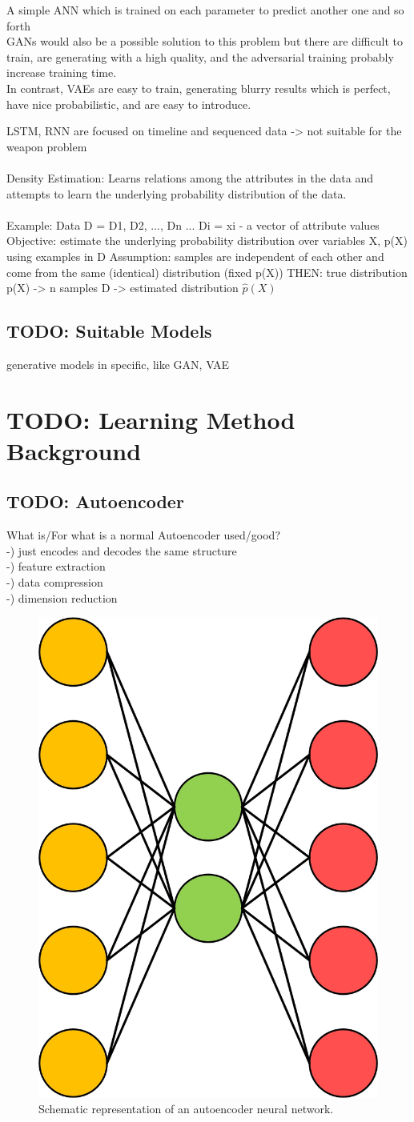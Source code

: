 \documentclass[MGS,Master,english]{twbook}%
\begin{document}
{A simple ANN which is trained on each parameter to predict another one and so forth\\
GANs would also be a possible solution to this problem but there are difficult to train, are generating with a high quality, and the adversarial training probably increase training time.\\
In contrast, VAEs are easy to train, generating blurry results which is perfect, have nice probabilistic, and are easy to introduce.

}
LSTM, RNN are focused on timeline and sequenced data -> not suitable for the weapon problem\\
\\
Density Estimation: Learns relations among the attributes in the data and attempts to learn the underlying probability distribution of the data.\\
\\
Example: Data D = {D1, D2, ..., Dn} ... Di = xi - a vector of attribute values
Objective: estimate the underlying probability distribution over variables X, p(X) using examples in D
Assumption: samples are independent of each other and come from the same (identical) distribution (fixed p(X))
THEN:
true distribution p(X) -> n samples D -> estimated distribution $\hat{p}(X)$

\subsection{TODO: Suitable Models}
generative models in specific, like GAN, VAE 



\section{TODO: Learning Method Background}

\subsection{TODO: Autoencoder}
What is/For what is a normal Autoencoder used/good? \\
-) just encodes and decodes the same structure\\
-) feature extraction\\
-) data compression\\
-) dimension reduction
\begin{figure}[!htbp]
	\centering
	\includegraphics[width=0.3\linewidth]{PICs/NNs/autoencoder}
	\caption{Schematic representation of an autoencoder neural network.}
\end{figure}
\end{document}
